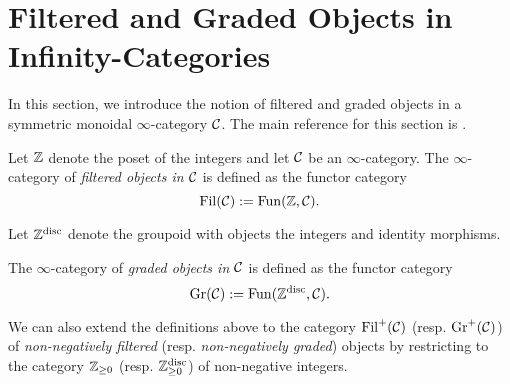 %	
%

\section{Filtered and Graded Objects in Infinity-Categories}
In this section, we introduce the notion of filtered and graded objects in a symmetric monoidal $\infty$-category ${\mathcal{C}}$.
The main reference for this section is \cite{Brantner-Mathew}.
\begin{definition}
	Let ${\mathbb{Z}}$ denote the poset of the integers and let ${\mathcal{C}}$ be an $\infty$-category.
	The $\infty$-category of \emph{filtered objects in ${\mathcal{C}}$} is defined as the functor category 
	$$
	\operatorname{\operatorname{Fil}}({\mathcal{C}}) :=\operatorname{Fun}({\mathbb{Z}}, {\mathcal{C}}).
	$$
\end{definition}

Let ${\mathbb{Z}}^{\operatorname{disc}}$ denote the groupoid with objects the integers and identity morphisms.
\begin{definition}
	The $\infty$-category of \emph{graded objects in ${\mathcal{C}}$} is defined as the functor category 
	$$
	\operatorname{\operatorname{Gr}}({\mathcal{C}}):=\operatorname{Fun}({\mathbb{Z}}^{\operatorname{disc}}, {\mathcal{C}}).
	$$
\end{definition}

\begin{remark}
	We can also extend the definitions above to the category $\operatorname{\operatorname{Fil}}^{+}({\mathcal{C}})$ (resp. $\operatorname{Gr}^{+}({\mathcal{C}})$) of \emph{non-negatively filtered} (resp. \emph{non-negatively graded}) objects by restricting to the category ${\mathbb{Z}}_{\geq 0}$ (resp. ${\mathbb{Z}}^{\operatorname{disc}}_{\geq 0}$) of non-negative integers.
\end{remark}

